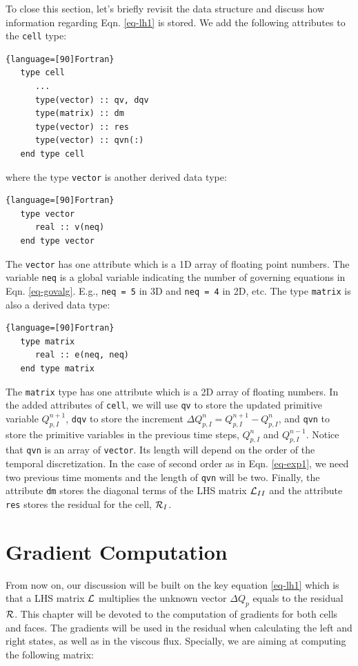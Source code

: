 \documentclass[12pt, letterpaper]{report}
\begin{document}
To close this section, let's briefly revisit the data structure and discuss how information
regarding Eqn. \ref{eq-lh1} is stored. We add the following attributes to the \verb+cell+ type:

\begin{lstlisting}{language=[90]Fortran}
   type cell
      ...
      type(vector) :: qv, dqv
      type(matrix) :: dm
      type(vector) :: res
      type(vector) :: qvn(:)
   end type cell
\end{lstlisting}

where the type \verb+vector+ is another derived data type:

\begin{lstlisting}{language=[90]Fortran}
   type vector
      real :: v(neq)
   end type vector
\end{lstlisting}

The \verb+vector+ has one attribute which is a 1D array of floating point numbers. The variable
\verb+neq+ is a global variable indicating the number of governing equations in Eqn.
\ref{eq-govalg}. E.g., \verb+neq = 5+ in 3D and \verb+neq = 4+ in 2D, etc. The type \verb+matrix+ is
also a derived data type:

\begin{lstlisting}{language=[90]Fortran}
   type matrix
      real :: e(neq, neq)
   end type matrix
\end{lstlisting}

The \verb+matrix+ type has one attribute which is a 2D array of floating numbers. In the added
attributes of \verb+cell+, we will use \verb+qv+ to store the updated primitive variable
$Q_{p,I}^{n+1}$, \verb+dqv+ to store the increment $\Delta Q_{p,I}^n = Q_{p,I}^{n+1} -
Q_{p,I}^{n}$, and \verb+qvn+ to store the primitive variables in the previous time steps,
$Q_{p,I}^{n}$ and $Q_{p,I}^{n-1}$. Notice that \verb+qvn+ is an array of \verb+vector+. Its length
will depend on the order of the temporal discretization. In the case of second order as in Eqn.
\ref{eq-exp1}, we need two previous time moments and the length of \verb+qvn+ will be two. Finally,
the attribute \verb+dm+ stores the diagonal terms of the LHS matrix $\mathcal{L}_{II}$ and the attribute
\verb+res+ stores the residual for the cell, $\mathcal{R}_I$. \paraspace

\section{Gradient Computation}

From now on, our discussion will be built on the key equation \ref{eq-lh1} which is that a LHS
matrix $\mathcal{L}$ multiplies the unknown vector $\Delta Q_p$ equals to the residual $\mathcal{R}$. This chapter
will be devoted to the computation of gradients for both cells and faces. The gradients will be used
in the residual when calculating the left and right states, as well as in the viscous flux.
Specially, we are aiming at computing the following matrix:
\end{document}
